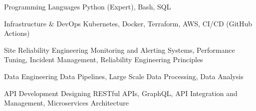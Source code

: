 


\begin{cvskills}


\cvskill
{Programming Languages} %
{Python (Expert), Bash, SQL} %


\cvskill
{Infrastructure \& DevOps} %
{Kubernetes, Docker, Terraform, AWS, CI/CD (GitHub Actions)} %


\cvskill
{Site Reliability Engineering} %
{Monitoring and Alerting Systems, Performance Tuning, Incident Management, Reliability Engineering Principles} %


\cvskill
{Data Engineering} %
{Data Pipelines, Large Scale Data Processing, Data Analysis} %


\cvskill
{API Development} %
{Designing RESTful APIs, GraphQL, API Integration and Management, Microservices Architecture} %


\end{cvskills}
